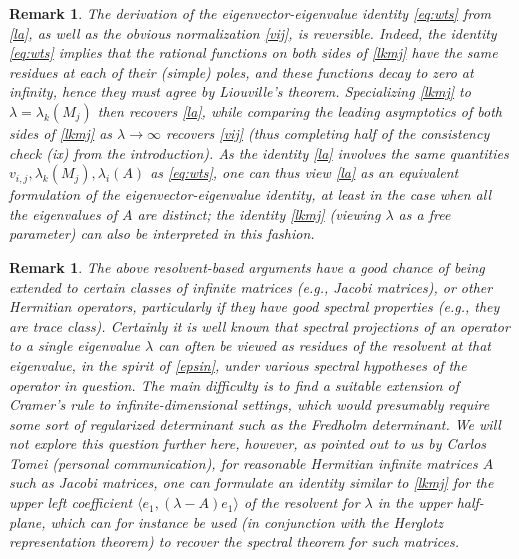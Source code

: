 \documentclass[12pt]{amsart}
\newtheorem{remark}[lemma]{Remark}
\begin{document}
\begin{remark}\label{reverse} The derivation of the eigenvector-eigenvalue identity \eqref{eq:wts} from \eqref{la}, as well as the obvious normalization \eqref{vij}, is reversible.  Indeed, the identity \eqref{eq:wts} implies that the rational functions on both sides of \eqref{lkmj} have the same residues at each of their (simple) poles, and these functions decay to zero at infinity, hence they must agree by Liouville's theorem.  Specializing \eqref{lkmj} to $\lambda = \lambda_k(M_j)$ then recovers \eqref{la}, while comparing the leading asymptotics of both sides of \eqref{lkmj} as $\lambda \to \infty$ recovers \eqref{vij} (thus completing half of the consistency check (ix) from the introduction).  As the identity \eqref{la} involves the same quantities $v_{i,j}, \lambda_k(M_j), \lambda_i(A)$ as \eqref{eq:wts}, one can thus view \eqref{la} as an equivalent formulation of the eigenvector-eigenvalue identity, at least in the case when all the eigenvalues of $A$ are distinct; the identity \eqref{lkmj} (viewing $\lambda$ as a free parameter) can also be interpreted in this fashion.
\end{remark}

\begin{remark} The above resolvent-based arguments have a good chance of being extended to certain classes of infinite matrices (e.g., Jacobi matrices), or other Hermitian operators, particularly if they have good spectral properties (e.g., they are trace class).  Certainly it is well known that spectral projections of an operator to a single eigenvalue $\lambda$ can often be viewed as residues of the resolvent at that eigenvalue, in the spirit of \eqref{epsin}, under various spectral hypotheses of the operator in question.  The main difficulty is to find a suitable extension of Cramer's rule to infinite-dimensional settings, which would presumably require some sort of regularized determinant such as the Fredholm determinant.  We will not explore this question further here, however, as pointed out to us by Carlos Tomei (personal communication), for reasonable Hermitian infinite matrices $A$ such as Jacobi matrices, one can formulate an identity similar to \eqref{lkmj} for the upper left coefficient $\langle e_1, (\lambda - A) e_1 \rangle$ of the resolvent for $\lambda$ in the upper half-plane, which can for instance be used (in conjunction with the Herglotz representation theorem) to recover the spectral theorem for such matrices.
\end{remark}
\end{document}
